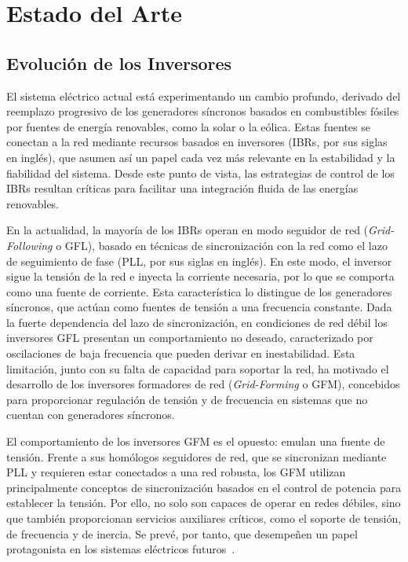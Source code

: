 \chapter{Estado del Arte}

\section{Evolución de los Inversores}

El sistema eléctrico actual está experimentando un cambio profundo, derivado del reemplazo progresivo de los generadores síncronos basados en combustibles fósiles por fuentes de energía renovables, como la solar o la eólica. Estas fuentes se conectan a la red mediante recursos basados en inversores (IBRs, por sus siglas en inglés), que asumen así un papel cada vez más relevante en la estabilidad y la fiabilidad del sistema. Desde este punto de vista, las estrategias de control de los IBRs resultan críticas para facilitar una integración fluida de las energías renovables.

En la actualidad, la mayoría de los IBRs operan en modo seguidor de red (\textit{Grid-Following} o GFL), basado en técnicas de sincronización con la red como el lazo de seguimiento de fase (PLL, por sus siglas en inglés). En este modo, el inversor sigue la tensión de la red e inyecta la corriente necesaria, por lo que se comporta como una fuente de corriente. Esta característica lo distingue de los generadores síncronos, que actúan como fuentes de tensión a una frecuencia constante. Dada la fuerte dependencia del lazo de sincronización, en condiciones de red débil los inversores GFL presentan un comportamiento no deseado, caracterizado por oscilaciones de baja frecuencia que pueden derivar en inestabilidad. Esta limitación, junto con su falta de capacidad para soportar la red, ha motivado el desarrollo de los inversores formadores de red (\textit{Grid-Forming} o GFM), concebidos para proporcionar regulación de tensión y de frecuencia en sistemas que no cuentan con generadores síncronos.

El comportamiento de los inversores GFM es el opuesto: emulan una fuente de tensión. Frente a sus homólogos seguidores de red, que se sincronizan mediante PLL y requieren estar conectados a una red robusta, los GFM utilizan principalmente conceptos de sincronización basados en el control de potencia para establecer la tensión. Por ello, no solo son capaces de operar en redes débiles, sino que también proporcionan servicios auxiliares críticos, como el soporte de tensión, de frecuencia y de inercia. Se prevé, por tanto, que desempeñen un papel protagonista en los sistemas eléctricos futuros~\cite{10457945}.


